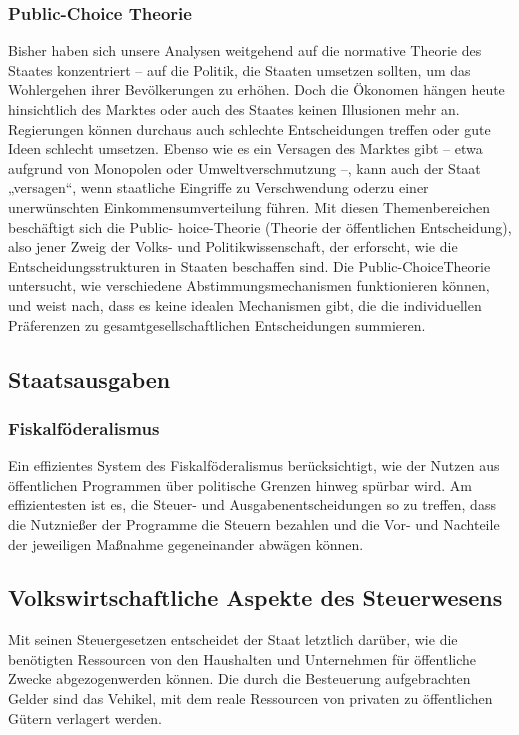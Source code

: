 \documentclass[10pt]{scrartcl}
\begin{document}
\subsubsection{Public-Choice Theorie}
Bisher haben sich unsere Analysen weitgehend auf die normative Theorie des Staates konzentriert – auf die Politik, die Staaten umsetzen sollten, um das Wohlergehen ihrer Bevölkerungen zu erhöhen. Doch die Ökonomen hängen heute hinsichtlich des Marktes oder auch des Staates keinen Illusionen mehr an. Regierungen können durchaus auch schlechte Entscheidungen treffen oder gute Ideen schlecht umsetzen. Ebenso wie es ein Versagen des Marktes gibt – etwa aufgrund von Monopolen oder Umweltverschmutzung –, kann auch der Staat „versagen“, wenn staatliche Eingriffe zu Verschwendung oderzu einer unerwünschten  Einkommensumverteilung führen. Mit diesen Themenbereichen beschäftigt sich die Public- hoice-Theorie (Theorie der öffentlichen Entscheidung), also jener Zweig der Volks- und Politikwissenschaft, der erforscht, wie die Entscheidungsstrukturen in Staaten beschaffen sind. Die Public-ChoiceTheorie untersucht, wie verschiedene Abstimmungsmechanismen funktionieren können, und weist nach, dass es keine idealen Mechanismen gibt, die die individuellen Präferenzen zu gesamtgesellschaftlichen Entscheidungen summieren. 

\subsection{Staatsausgaben}
\subsubsection{Fiskalföderalismus}
Ein effizientes System des Fiskalföderalismus berücksichtigt, wie der Nutzen aus öffentlichen Programmen über politische Grenzen hinweg spürbar wird. Am effizientesten ist es, die Steuer- und Ausgabenentscheidungen so zu treffen, dass die Nutznießer der Programme die Steuern bezahlen und die Vor- und Nachteile der jeweiligen Maßnahme gegeneinander abwägen können.

\subsection{Volkswirtschaftliche Aspekte des Steuerwesens}
Mit seinen Steuergesetzen entscheidet der Staat letztlich darüber, wie die benötigten Ressourcen von den Haushalten und Unternehmen für öffentliche Zwecke abgezogenwerden können. Die durch die Besteuerung aufgebrachten Gelder sind das Vehikel, mit dem reale Ressourcen von privaten zu öffentlichen Gütern verlagert werden.\\
\end{document}
